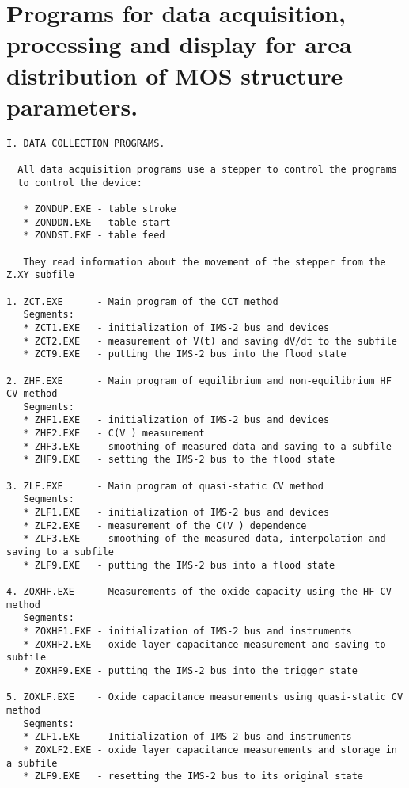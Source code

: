 
\chapter{Programs for data acquisition, processing and display for area distribution of MOS structure parameters.}\label{app:AppendixH}

\begin{verbatim}
I. DATA COLLECTION PROGRAMS.

  All data acquisition programs use a stepper to control the programs
  to control the device:

   * ZONDUP.EXE - table stroke
   * ZONDDN.EXE - table start
   * ZONDST.EXE - table feed

   They read information about the movement of the stepper from the Z.XY subfile

1. ZCT.EXE      - Main program of the CCT method
   Segments:
   * ZCT1.EXE   - initialization of IMS-2 bus and devices
   * ZCT2.EXE   - measurement of V(t) and saving dV/dt to the subfile
   * ZCT9.EXE   - putting the IMS-2 bus into the flood state

2. ZHF.EXE      - Main program of equilibrium and non-equilibrium HF CV method
   Segments:
   * ZHF1.EXE   - initialization of IMS-2 bus and devices
   * ZHF2.EXE   - C(V ) measurement
   * ZHF3.EXE   - smoothing of measured data and saving to a subfile
   * ZHF9.EXE   - setting the IMS-2 bus to the flood state

3. ZLF.EXE      - Main program of quasi-static CV method
   Segments:
   * ZLF1.EXE   - initialization of IMS-2 bus and devices
   * ZLF2.EXE   - measurement of the C(V ) dependence
   * ZLF3.EXE   - smoothing of the measured data, interpolation and saving to a subfile
   * ZLF9.EXE   - putting the IMS-2 bus into a flood state

4. ZOXHF.EXE    - Measurements of the oxide capacity using the HF CV method
   Segments:
   * ZOXHF1.EXE - initialization of IMS-2 bus and instruments
   * ZOXHF2.EXE - oxide layer capacitance measurement and saving to subfile
   * ZOXHF9.EXE - putting the IMS-2 bus into the trigger state

5. ZOXLF.EXE    - Oxide capacitance measurements using quasi-static CV method
   Segments:
   * ZLF1.EXE   - Initialization of IMS-2 bus and instruments
   * ZOXLF2.EXE - oxide layer capacitance measurements and storage in a subfile
   * ZLF9.EXE   - resetting the IMS-2 bus to its original state



\end{verbatim}

